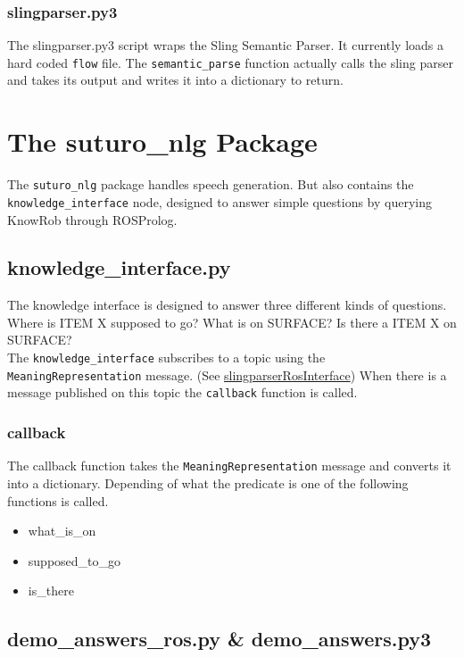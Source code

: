 \documentclass[main.tex]{subfiles}
\begin{document}
        \subsubsection{slingparser.py3}
            The slingparser.py3 script wraps the Sling Semantic Parser. It currently loads a hard coded \texttt{flow} file.
            The \texttt{semantic\_parse} function actually calls the sling parser and takes its output and writes it into a dictionary to return.
    
\section{The suturo\_nlg Package}
    The \texttt{suturo\_nlg} package handles speech generation. But also contains the \texttt{knowledge\_interface} node, designed to answer simple questions by querying KnowRob through ROSProlog.
    \subsection{knowledge\_interface.py}
        The knowledge interface is designed to answer three different kinds of questions. Where is ITEM X supposed to go? What is on SURFACE? Is there a ITEM X on SURFACE?\\
        The \texttt{knowledge\_interface} subscribes to a topic using the \texttt{MeaningRepresentation} message. (See \hyperref[slingparserros]{slingparserRosInterface}) When there is a message published on this topic the \texttt{callback} function is called.
        \subsubsection{callback}
            The callback function takes the \texttt{MeaningRepresentation} message and converts it into a dictionary.
            Depending of what the predicate is one of the following functions is called.
            \begin{itemize}
                \item what\_is\_on
                \item supposed\_to\_go
                \item is\_there             
            \end{itemize}
    \subsection{demo\_answers\_ros.py \& demo\_answers.py3}
    
\end{document}
